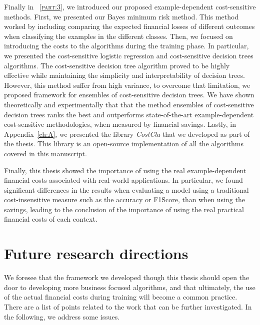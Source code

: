Finally in \partname{~\textsc{\ref{part:3}}}, we introduced our proposed example-dependent 
cost-sensitive methods. First, we presented our Bayes minimum risk method. This method worked by 
including comparing the expected financial losses of different outcomes when classifying the 
examples in the different classes. Then, we focused on introducing the costs to the algorithms 
during the training phase. In particular, we presented the cost-sensitive logistic regression and  
cost-sensitive decision trees algorithms. The cost-sensitive decision tree algorithm proved to be 
highly effective while maintaining the simplicity and interpretability of decision trees. However, 
this method suffer from high variance, to overcome that limitation, we proposed framework for 
ensembles of cost-sensitive decision trees. We have shown theoretically and experimentally that 
that the method ensembles of cost-sensitive decision trees ranks the best and outperforms 
state-of-the-art example-dependent cost-sensitive methodologies, when measured by financial savings.
Lastly, in Appendix~\ref{ch:A}, we presented the library \mbox{\textit{CostCla}} that we developed 
as part of the thesis. This library is an open-source implementation of all the algorithms covered 
in this manuscript. 

Finally, this thesis showed the importance of using the real example-dependent financial costs 
associated with real-world applications. In particular, we found significant differences in the 
results when evaluating a model using a  traditional cost-insensitive measure such as the 
accuracy or F1Score,  than when using the savings, leading to the conclusion of the 
importance of using the real practical financial costs of each context.


\section{Future research directions}

We foresee that the framework we developed though this thesis should open the door to developing 
more business focused algorithms, and that ultimately, the use of the actual financial costs during 
training will become a common practice. There are a list of points related to the work that can be 
further investigated. In the following, we address some issues. 

